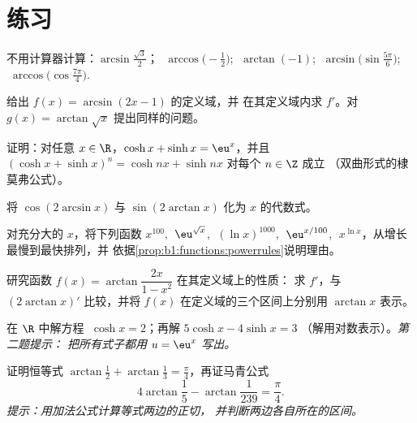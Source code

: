\section{练习}

\begin{exercise}[$\star$]\label{exo:b1:functions:1}
不用计算器计算：$\arcsin\frac{\sqrt 3}{2}$；
$\;\arccos\bigl(-\frac 12\bigr)$; $\;\arctan(-1)$;
$\;\arcsin\bigl(\sin\frac{5\pi}{6}\bigr)$;
$\;\arccos\bigl(\cos\frac{7\pi}{4}\bigr)$.
\end{exercise}

\begin{exercise}[$\star$]\label{exo:b1:functions:2}
给出 $f(x) = \arcsin(2x - 1)$ 的定义域，并
在其定义域内求 $f'$。对 $g(x) = \arctan\sqrt{x}$ 提出同样的问题。
\end{exercise}

\begin{exercise}[$\star$]\label{exo:b1:functions:3}
证明：对任意 $x \in \R$，$\cosh x + \sinh x = \eu^x$，并且
$(\cosh x + \sinh x)^n = \cosh nx + \sinh nx$ 对每个 $n \in \Z$ 成立
（双曲形式的棣莫弗公式）。
\end{exercise}

\begin{exercise}[$\star$]\label{exo:b1:functions:4}
将 $\cos(2\arcsin x)$ 与 $\sin(2\arctan x)$ 化为
$x$ 的代数式。
\end{exercise}

\begin{exercise}[$\star$]\label{exo:b1:functions:5}
对充分大的 $x$，将下列函数
$x^{100}$, $\;\eu^{\sqrt x}$, $\;(\ln x)^{1000}$, $\;\eu^{x/100}$,
$\;x^{\ln x}$，从增长最慢到最快排列，并
依据\cref{prop:b1:functions:powerrules}说明理由。
\end{exercise}

\begin{exercise}[$\star\star$]\label{exo:b1:functions:6}
研究函数 $f(x) = \arctan\dfrac{2x}{1 - x^2}$ 在其定义域上的性质：
求 $f'$，与 $(2\arctan x)'$ 比较，并将 $f(x)$
在定义域的三个区间上分别用 $\arctan x$ 表示。
\end{exercise}

\begin{exercise}[$\star\star$]\label{exo:b1:functions:7}
在 $\R$ 中解方程 $\;\cosh x = 2$；再解 $5\cosh x - 4 \sinh x = 3$
（解用对数表示）。\emph{第二题提示：
把所有式子都用 $u = \eu^x$ 写出。}
\end{exercise}

\begin{exercise}[$\star\star$]\label{exo:b1:functions:8}
证明恒等式 $\arctan\frac{1}{2} + \arctan\frac{1}{3} =
\frac{\pi}{4}$，再证马青公式
\[
4\arctan\frac 15 - \arctan\frac{1}{239} = \frac{\pi}{4}.
\]
\emph{提示：用加法公式计算等式两边的正切，
并判断两边各自所在的区间。}
\end{exercise}

